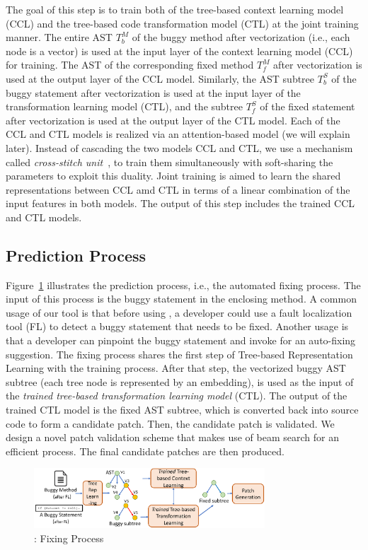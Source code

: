 \vspace{3pt}
The goal of this step is to train both of the tree-based context
learning model (CCL) and the tree-based code transformation model
(CTL) at the joint training manner. The entire AST $T^{M}_b$ of the
buggy method after vectorization (i.e., each node is a vector) is used
at the input layer of the context learning model (CCL) for
training. The AST of the corresponding fixed method $T^{M}_f$ after
vectorization is used at the output layer of the CCL model. Similarly,
the AST subtree $T^{S}_b$ of the buggy statement after vectorization
is used at the input layer of the transformation learning model (CTL),
and the subtree $T^{S}_f$ of the fixed statement after vectorization
is used at the output layer of the CTL model. Each of the CCL and CTL
models is realized via an attention-based  model (we
will explain later). Instead of cascading the two models CCL and CTL,
we use a mechanism called {\em cross-stitch
  unit}~\cite{misra2016cross}, to train them simultaneously with
soft-sharing the parameters to exploit this duality. Joint training is
aimed to learn the shared representations between CCL amd CTL in terms
of a linear combination of the input features in both models. The
output of this step includes the trained CCL and CTL models.

\subsection{Prediction Process}



Figure~\ref{overview-fixing} illustrates the prediction process, i.e.,
the automated fixing process. The input of this process is the buggy
statement in the enclosing method. A common usage of our tool is that
before using {\tool}, a developer could use a fault localization tool
(FL) to detect a buggy statement that needs to be fixed. Another usage
is that a developer can pinpoint the buggy statement and invoke {\tool}
for an auto-fixing suggestion. The fixing process shares the first
step of Tree-based Representation Learning with the training process. After
that step, the vectorized buggy AST subtree (each tree node is
represented by an embedding), is used as the input of the {\em trained
  tree-based transformation learning model} (CTL). The output of the
trained CTL model is the fixed AST subtree, which is converted back
into source code to form a candidate patch. Then, the candidate patch
is validated. We design a novel patch validation scheme that makes use
of beam search for an efficient process. The final candidate patches
are then produced.

\begin{figure}[t]
	\centering
	\includegraphics[width=3.4in]{graphs/overview-predict.png}
	\caption{{\tool}: Fixing Process}
        \vspace{-3pt}
	\label{overview-fixing}
\end{figure}
